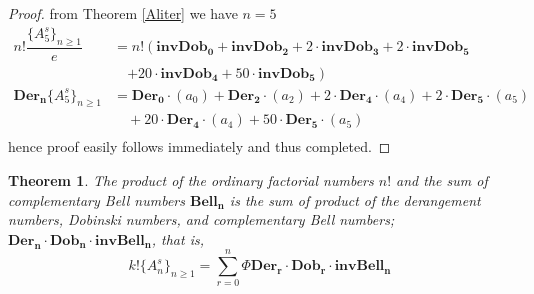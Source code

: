 \documentclass[pdflatex,sn-mathphys-num]{sn-jnl}%
\newtheorem{theorem}{Theorem}
\theoremstyle{thmstyleone}%
\theoremstyle{thmstyletwo}%
\theoremstyle{thmstylethree}%
\begin{document}
\begin{proof}
from Theorem \ref{Aliter} we have $n=5$
\begin{align*}
   n! \dfrac{\lbrace A_5^s\rbrace_{n\geq 1}}{e} &= n!\left(\mathbf{invDob_0} + \mathbf{invDob_2} + 2\cdotp \mathbf{invDob_3} +2\cdotp \mathbf{invDob_5} \right. \\
&\quad  \left.  + 20\cdotp \mathbf{invDob_4} + 50\cdotp \mathbf{invDob_{5}}\right) \\
  \mathbf{Der_n}\lbrace A_5^s\rbrace_{n\geq 1}&= \mathbf{Der_0}\cdotp(a_0) + \mathbf{Der_2}\cdotp(a_2) + 2\cdotp \mathbf{Der_4}\cdotp(a_4) +2\cdotp \mathbf{Der_5}\cdotp(a_5) \\
  & \quad + 20\cdotp \mathbf{Der_4}\cdotp(a_4) + 50\cdotp \mathbf{Der_{5}}\cdotp(a_5)\\
\end{align*}
hence proof easily follows immediately and thus completed.
\end{proof}
\begin{theorem}\label{div}
    The product of the ordinary factorial numbers $n!$ and the sum of complementary Bell numbers $\mathbf{Bell_n}$ is the sum of product of the derangement numbers, Dobinski numbers, and complementary Bell numbers; $\mathbf{Der_n \cdotp Dob_n \cdotp \mathbf{invBell_n}}$, that is,
    $$k! \lbrace A_n^s\rbrace_{n\geq 1}=\sum_{r=0}^{n} \Phi \mathbf{Der_r \cdotp Dob_r}\cdotp \mathbf{invBell_n}$$
\end{theorem}
\end{document}
